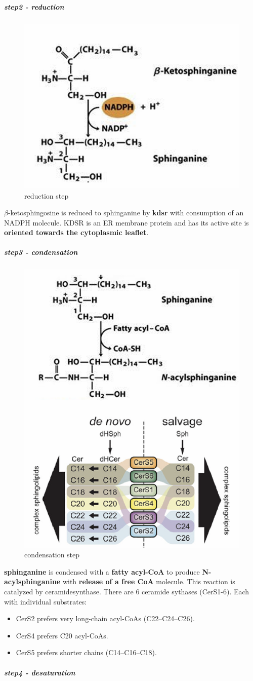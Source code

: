 \documentclass[../main.tex]{subfiles}
\begin{document}
\subparagraph{step2 - reduction}
\begin{figure}[H]
    \centering
    \includegraphics[width=0.5\linewidth]{step2S.png}
    \caption{reduction step}
    \label{fig:enter-label}
\end{figure}
$\beta$-ketosphingosine is reduced to 
sphinganine by \textbf{\gls{kdsr}} with 
consumption of an NADPH molecule.  
KDSR is an ER membrane protein and 
has its active site  is \textbf{oriented towards the 
cytoplasmic leaflet}.

\subparagraph{step3 - condensation}
\begin{figure}[H]
    \centering
    \includegraphics[width=0.5\linewidth]{step3S.png}
    \caption{condensation step}
    \label{fig:enter-label}
\end{figure}
\textbf{sphinganine} is condensed with a \textbf{fatty 
acyl-CoA} to produce \textbf{N-acylsphinganine } with \textbf{release of a free CoA }
molecule. This reaction is catalyzed by \gls{ceramidesynthase}. There are 6 ceramide sythases (CerS1-6). Each with individual substrates:
\begin{itemize}
    \item CerS2 prefers very long-chain acyl-CoAs (C22–C24–C26).
    \item CerS4 prefers C20 acyl-CoAs.
    \item CerS5 prefers shorter chains (C14–C16–C18).
\end{itemize}
\subparagraph{step4 - desaturation}
\end{document}

